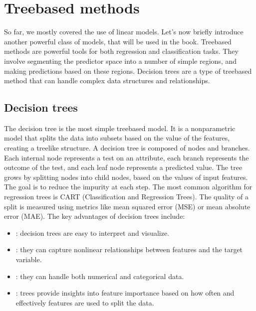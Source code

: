 \documentclass[letterpaper,10pt,english]{jupyterBook}
\begin{document}
\section{Tree\sphinxhyphen{}based methods}
\label{\detokenize{notebooks/review_ML:tree-based-methods}}
\sphinxAtStartPar
So far, we mostly covered the use of linear models. Let’s now briefly introduce another powerful class of models, that will be used in the book. Tree\sphinxhyphen{}based methods are powerful tools for both regression and classification tasks. They involve segmenting the predictor space into a number of simple regions, and making predictions based on these regions. Decision trees are a type of tree\sphinxhyphen{}based method that can handle complex data structures and relationships.


\subsection{Decision trees}
\label{\detokenize{notebooks/review_ML:decision-trees}}
\sphinxAtStartPar
The decision tree is the most simple tree\sphinxhyphen{}based model. It is a non\sphinxhyphen{}parametric model that splits the data into subsets based on the value of the features, creating a tree\sphinxhyphen{}like structure. A decision tree is composed of nodes and branches. Each internal node represents a test on an attribute, each branch represents the outcome of the test, and each leaf node represents a predicted value. The tree grows by splitting nodes into child nodes, based on the values of input features. The goal is to reduce the impurity at each step. The most common algorithm for regression trees is CART (Classification and Regression Trees). The quality of a split is measured using metrics like mean squared error (MSE) or mean absolute error (MAE). The key advantages of decision trees include:
\begin{itemize}
\item {} 
\sphinxAtStartPar
{}: decision trees are easy to interpret and visualize.

\item {} 
\sphinxAtStartPar
{}: they can capture non\sphinxhyphen{}linear relationships between features and the target variable.

\item {} 
\sphinxAtStartPar
{}: they can handle both numerical and categorical data.

\item {} 
\sphinxAtStartPar
{}: trees provide insights into feature importance based on how often and effectively features are used to split the data.

\end{itemize}
\end{document}
